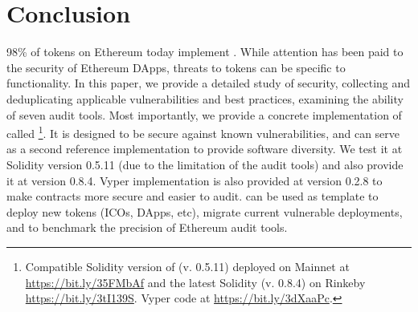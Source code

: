 
\section{Conclusion}

98\% of tokens on Ethereum today implement \erc. While attention has been paid to the security of Ethereum DApps, threats to tokens can be specific to \erc functionality. In this paper, we provide a detailed study of \erc security, collecting and deduplicating applicable vulnerabilities and best practices, examining the ability of seven audit tools. Most importantly, we provide a concrete implementation of \erc called \sys\footnote{Compatible Solidity version of \sys (v. 0.5.11) deployed on Mainnet at \url{https://bit.ly/35FMbAf} and the latest Solidity (v. 0.8.4) on Rinkeby \url{https://bit.ly/3tI139S}. Vyper code at \url{https://bit.ly/3dXaaPc}.}. It is designed to be secure against known vulnerabilities, and can serve as a second reference implementation to provide software diversity. We test it at Solidity version 0.5.11 (due to the limitation of the audit tools) and also provide it at version 0.8.4. Vyper implementation is also provided at version 0.2.8 to make \erc contracts more secure and easier to audit. \sys can be used as template to deploy new \erc tokens (\eg ICOs, DApps, etc), migrate current vulnerable deployments, and to benchmark the precision of Ethereum audit tools.



